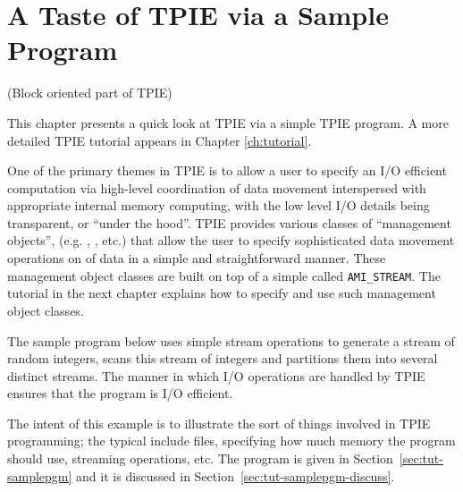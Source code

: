 \chapter{A Taste of TPIE via a Sample Program}

\tobewritten(Block oriented part of TPIE)

This chapter presents a quick look at TPIE via a simple TPIE program.
A more detailed TPIE tutorial appears in Chapter \ref{ch:tutorial}.

One of the primary themes in TPIE is to allow a user to specify an I/O
efficient computation via high-level coordination of data movement
interspersed with appropriate internal memory computing, with the low
level I/O details being transparent, or ``under the hood''.  TPIE
provides various classes of ``management objects'', (e.g. , , etc.) that
allow the user to specify sophisticated data movement operations on
 of data in a simple and straightforward manner. These
management object classes are built on top of a simple  called \lstinline|AMI_STREAM|. The tutorial in the next
chapter explains how to specify and use such management object
classes.

The sample program below uses simple stream
operations %
to generate a stream of random integers, scans this stream
of integers and partitions them into several distinct
streams. The manner in which I/O operations are handled by
TPIE ensures that the program is I/O efficient.


The intent of this example is to illustrate the sort of things
involved in TPIE programming; the typical include files, specifying
how much memory the program should use, streaming operations, etc. The
program is given in Section~\ref{sec:tut-samplepgm} and it is
discussed in Section~\ref{sec:tut-samplepgm-discuss}.


